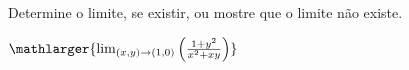 Determine o limite, se existir, ou mostre que o limite não existe.

$\mathlarger{\lim_{(x,y)\rightarrow(1,0)}  \left( \frac{1+y^2}{x^2+xy} \right)}$


